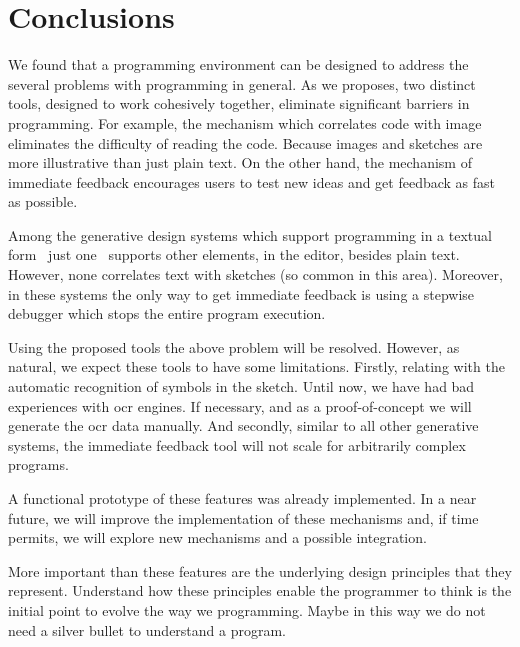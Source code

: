 
% 
% 

\section{Conclusions}
\label{sec:fin}

We found that a programming environment can be designed to address the several problems with programming in general. As we proposes, two distinct tools, designed to work cohesively together, eliminate significant barriers in programming. For example, the mechanism which correlates code with image eliminates the difficulty of reading the code. Because images and sketches are more illustrative than just plain text. On the other hand, the mechanism of immediate feedback encourages users to test new ideas and get feedback as fast as possible.

Among the generative design systems which support programming in a textual form~\cite{aish2012designscript,lopes2011portable} just one~\cite{lopes2011portable} supports other elements, in the editor, besides plain text. However, none correlates text with sketches (so common in this area). Moreover, in these systems the only way to get immediate feedback is using a stepwise debugger which stops the entire program execution.

Using the proposed tools the above problem will be resolved. However, as natural, we expect these tools to have some limitations. Firstly, relating with the automatic recognition of symbols in the sketch. Until now, we have had bad experiences with \ac{ocr} engines. If necessary, and as a proof-of-concept we will generate the \ac{ocr} data manually. And secondly, similar to all other generative systems, the immediate feedback tool will not scale for arbitrarily complex programs.

A functional prototype of these features was already implemented. In a near future, we will improve the implementation of these mechanisms and, if time permits, we will explore new mechanisms and a possible integration.

More important than these features are the underlying design principles that they represent. Understand how these principles enable the programmer to think is the initial point to evolve the way we programming. Maybe in this way we do not need a silver bullet to understand a program.